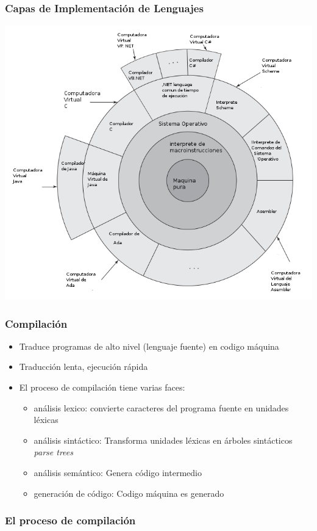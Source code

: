 \documentclass[11pt]{article}
\begin{document}
\subsubsection*{Capas de Implementación de Lenguajes}
\label{sec:orgheadline15}

\includegraphics[width=.9\linewidth]{interfacecapas.png}

\subsubsection*{Compilación}
\label{sec:orgheadline16}
\begin{itemize}
\item Traduce programas de alto nivel (lenguaje fuente) en codigo máquina
\item Traducción lenta, ejecución rápida
\item El proceso de compilación tiene varias faces:
\begin{itemize}
\item análisis lexico: convierte caracteres del programa fuente en
unidades léxicas
\item análisis sintáctico: Transforma unidades léxicas en árboles
sintácticos \emph{parse trees}
\item análisis semántico: Genera código intermedio
\item generación de código: Codigo máquina es generado
\end{itemize}
\end{itemize}

\subsubsection*{El proceso de compilación}
\label{sec:orgheadline17}
\end{document}

